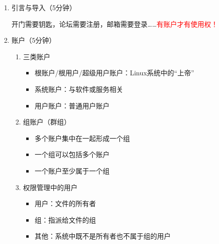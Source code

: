\documentclass{TIJMUjiaoanLL}
\begin{document}
\begin{enumerate}
  \item 引言与导入（5分钟）

    开门需要钥匙，论坛需要注册，邮箱需要登录……\textcolor{red}{有账户才有使用权！}

  \item 账户（5分钟）
    \begin{enumerate}
      \item 三类账户
	\begin{itemize}
	  \item 根账户/根用户/超级用户账户：Linux系统中的“上帝”
	  \item 系统账户：与软件或服务相关
	  \item 用户账户：普通用户账户
	\end{itemize}
      \item 组账户（群组）
	\begin{itemize}
	  \item 多个账户集中在一起形成一个组
	  \item 一个组可以包括多个账户
	  \item 一个账户至少属于一个组
	\end{itemize}
      \item 权限管理中的用户
	\begin{itemize}
	  \item 用户：文件的所有者
	  \item 组：指派给文件的组
	  \item 其他：系统中既不是所有者也不属于组的用户
	\end{itemize}
    \end{enumerate}


\end{enumerate}
\end{document}
